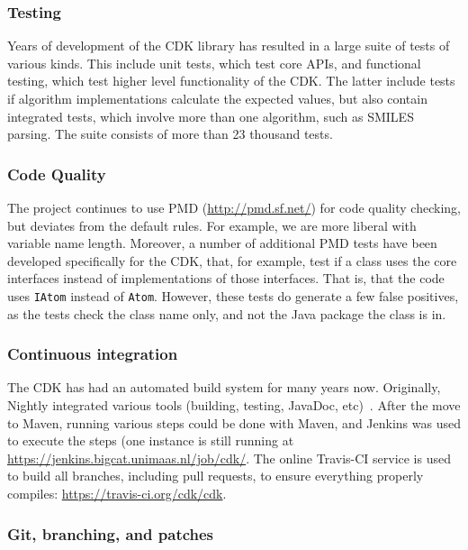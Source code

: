 \documentclass[doublespacing]{bmcart}
\begin{document}
\subsubsection*{Testing}

Years of development of the CDK library has resulted in a large suite of
tests of various kinds. This include unit tests, which test core APIs, and
functional testing, which test higher level functionality of the CDK. The
latter include tests if algorithm implementations calculate the expected
values, but also contain integrated tests, which involve more than one
algorithm, such as SMILES parsing. The suite consists of more than 23 thousand
tests.

\subsubsection*{Code Quality}

The project continues to use PMD (\url{http://pmd.sf.net/}) for code quality checking,
but deviates from the default rules. For example, we are more liberal with 
variable name length. Moreover, a number of additional PMD tests have been
developed specifically for the CDK, that, for example, test if a class uses
the core interfaces instead of implementations of those interfaces. That is,
that the code uses \texttt{IAtom} instead of \texttt{Atom}. However, these tests do generate a
few false positives, as the tests check the class name only, and not the
Java package the class is in.

\subsubsection*{Continuous integration}

The CDK has had an automated build system for many years now. Originally,
Nightly integrated various tools (building, testing, JavaDoc, etc)~\cite{Guha2006}.
After the move to Maven, running various steps could be done with Maven,
and Jenkins was used to execute the steps (one instance is still running
at \url{https://jenkins.bigcat.unimaas.nl/job/cdk/}. The online Travis-CI
service is used to build all branches, including pull requests, to ensure
everything properly compiles: \url{https://travis-ci.org/cdk/cdk}.

\subsubsection*{Git, branching, and patches}
\end{document}
